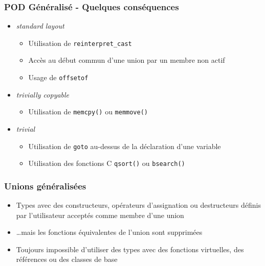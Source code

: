 \documentclass[C++.tex]{subfiles}
\begin{document}
\begin{frame}[fragile]
	\frametitle{POD Généralisé - Quelques conséquences}
	\begin{itemize}
		\item \textit{standard layout}
		\begin{itemize}
			\item Utilisation de \lstinline|reinterpret_cast|
			\item Accès au début commun d'une union par un membre non actif
			\item Usage de \lstinline|offsetof|
		\end{itemize}
	
		\item \textit{trivially copyable}
		\begin{itemize}
			\item Utilisation de \lstinline|memcpy()| ou \lstinline|memmove()|
		\end{itemize}

		\item \textit{trivial}
		\begin{itemize}
			\item Utilisation de \lstinline|goto| \og au-dessus\fg{} de la déclaration d'une variable
			\item Utilisation des fonctions C \lstinline|qsort()| ou \lstinline|bsearch()|
		\end{itemize}
	\end{itemize}
\end{frame}

\begin{frame}[fragile]
	\frametitle{Unions généralisées}
	\begin{itemize}
		\item Types avec des constructeurs, opérateurs d'assignation ou destructeurs définis par l'utilisateur acceptés comme membre d'une union
		\item \ldots mais les fonctions équivalentes de l'union sont supprimées


		\item Toujours impossible d'utiliser des types avec des fonctions virtuelles, des références ou des classes de base
	\end{itemize}
\end{frame}
\end{document}
